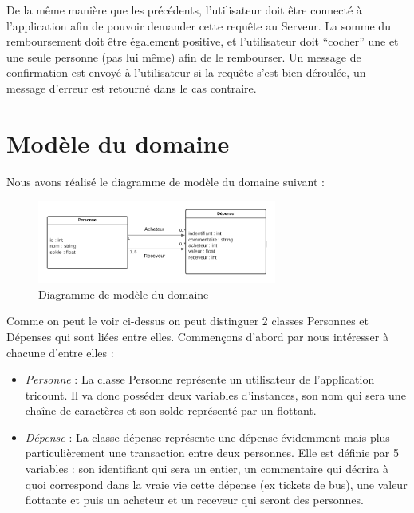 \documentclass[12,french]{report}
\begin{document}
De la même manière que les précédents, l’utilisateur doit être connecté à l’application afin de pouvoir demander cette requête au Serveur. La somme du remboursement doit être également positive, et l’utilisateur doit “cocher” une et une seule personne (pas lui même) afin de le rembourser. Un message de confirmation est envoyé à l’utilisateur si la requête s’est bien déroulée, un message d’erreur est retourné dans le cas contraire.

\section{Modèle du domaine}

Nous avons réalisé le diagramme de modèle du domaine suivant :\\

\begin{figure}[H]
	\center
	\includegraphics[width=0.7\textwidth]{./Images/Modele}
	\caption{Diagramme de modèle du domaine}
\end{figure}\vspace{0.2cm}

Comme on peut le voir ci-dessus on peut distinguer 2 classes Personnes et Dépenses qui sont liées entre elles. Commençons d’abord par nous intéresser à chacune d’entre elles :\\

\begin{itemize}[label=\textbullet]
	\item \emph{Personne} :
La classe Personne représente un utilisateur de l’application tricount. Il va donc posséder deux variables d’instances, son nom qui sera une chaîne de caractères et son solde représenté par un flottant.
	\item \emph{Dépense} :
La classe dépense représente une dépense évidemment mais plus particulièrement une transaction entre deux personnes. Elle est définie par 5 variables : son identifiant qui sera un entier, un commentaire qui décrira à quoi correspond dans la vraie vie cette dépense (ex tickets de bus), une valeur flottante et puis un acheteur et un receveur qui seront des personnes.
\end{itemize}\vspace{0.5cm}
\end{document}
